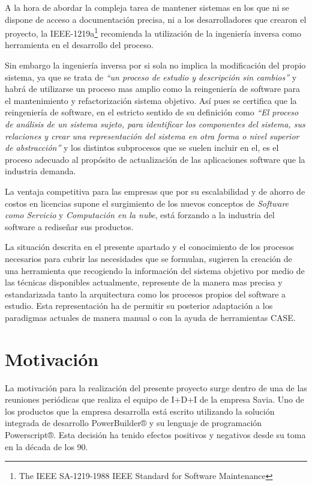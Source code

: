 A la hora de abordar la compleja tarea de mantener sistemas en los que ni se dispone de acceso a documentación precisa, ni a los desarrolladores
que crearon el proyecto, la IEEE-1219a\footnote{The IEEE SA-1219-1988 IEEE Standard for Software Maintenance} recomienda la utilización 
de la ingeniería inversa como herramienta en el desarrollo del proceso. 

Sin embargo la ingeniería inversa por si sola no implica la modificación del propio sistema, ya que se trata de \cite{Canfora2007} \textit{“un proceso de estudio y descripción sin cambios”} 
y habrá de utilizarse un proceso mas amplio como la reingeniería de software para el mantenimiento y refactorización sistema objetivo. 
Así pues se certifica que la reingeniería de software, en el estricto sentido de su definición como \textit{“El proceso de análisis de un sistema sujeto, para identificar los componentes del sistema, sus relaciones y crear una representación 
del sistema en otra forma o nivel superior de abstracción”} \cite{Chikofsky1990} y los distintos subprocesos que se suelen incluir en el, es el proceso adecuado al propósito de actualización
de las aplicaciones software que la industria demanda.

La ventaja competitiva para las empresas que por su escalabilidad y de ahorro de costos en licencias supone el surgimiento de los nuevos
conceptos de \textit{Software como Servicio} y \textit{Computación en la nube}, está forzando a la industria del software a rediseñar sus productos. 

La situación descrita en el presente apartado y el conocimiento de los procesos necesarios para cubrir las necesidades que se formulan, 
sugieren la creación de una herramienta que recogiendo la información del sistema objetivo por medio de las técnicas disponibles actualmente, 
represente de la manera mas precisa y estandarizada tanto la arquitectura como los procesos propios del software a estudio.
Esta representación ha de permitir su posterior adaptación a los paradigmas actuales de manera manual o con la ayuda de herramientas CASE.

\section{Motivación}

La motivación para la realización del presente proyecto surge dentro de una de las reuniones periódicas que realiza el equipo de I+D+I de la empresa Savia\cite{Savia}. 
Uno de los productos que la empresa desarrolla está escrito utilizando la solución integrada de desarrollo PowerBuilder® y su lenguaje de programación Powerscript®. Esta decisión ha tenido efectos positivos y negativos desde su toma en la década de los 90.


